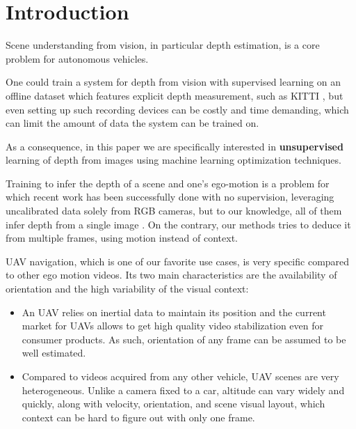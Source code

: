\documentclass[runningheads]{llncs}
\begin{document}
\section{Introduction}
\label{sec:intro}
Scene understanding from vision, in particular depth estimation, is a core problem for autonomous vehicles.

One could train a system for depth from vision with supervised learning on an offline dataset which features explicit depth measurement, such as KITTI \cite{geiger2013vision}, but even setting up such recording devices can be costly and time demanding, which can limit the amount of data the system can be trained on.

As a consequence, in this paper we are specifically interested in \textbf{unsupervised} learning of depth from images using machine learning optimization techniques.

Training to infer the depth of a scene and one's ego-motion is a problem for which recent work has been successfully done with no supervision, leveraging uncalibrated data solely from RGB cameras, but to our knowledge, all of them infer depth from a single image
\cite{zhou2017unsupervised,yin2018geonet,monodepth17,Vijayanarasimhan17,Mahjourian}. On the contrary, our methods tries to deduce it from multiple frames, using motion instead of context.

UAV navigation, which is one of our favorite use cases, is very specific compared to other ego motion videos. Its two main characteristics are the availability of orientation and the high variability of the visual context:

\begin{itemize}
\item An UAV relies on inertial data to maintain its position and the current market for UAVs allows to get high quality video stabilization even for consumer products. As such, orientation of any frame can be assumed to be well estimated.
\item Compared to videos acquired from any other vehicle,
UAV scenes are very heterogeneous. Unlike a camera fixed to a car, altitude can vary widely and quickly, along with velocity, orientation, and scene
visual layout,
which context can be hard to figure out with only one frame.
\end{itemize}
\end{document}
